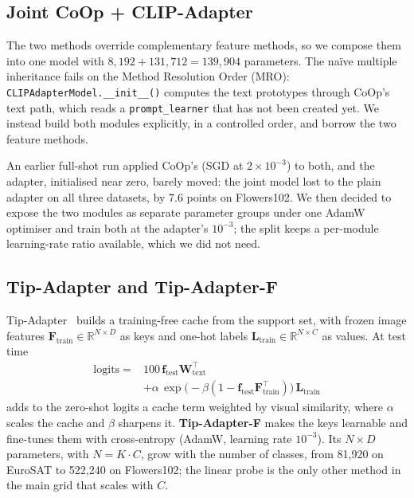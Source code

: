 \documentclass[10pt,twocolumn,letterpaper]{article}
\begin{document}
\subsection{Joint CoOp + CLIP-Adapter}\label{sec:joint}

The two methods override complementary feature methods, so we compose
them into one model with $8{,}192 + 131{,}712 = 139{,}904$ parameters.
The na\"ive multiple inheritance fails on the Method Resolution Order (MRO):
\texttt{CLIPAdapterModel.\_\_init\_\_()} computes the text prototypes
through CoOp's text path, which reads a \texttt{prompt\_learner} that has
not been created yet.  We instead build both modules explicitly, in a
controlled order, and borrow the two feature methods.

An earlier full-shot run applied CoOp's (SGD at $2\times10^{-3}$) to both, and the adapter,
initialised near zero, barely moved: the joint model lost to the plain adapter on all three datasets, by 7.6 points on Flowers102. We then decided to expose the two modules as separate parameter groups under one AdamW optimiser and train both at the adapter's $10^{-3}$; the split keeps a per-module learning-rate ratio available, which we did not need.

\subsection{Tip-Adapter and Tip-Adapter-F}\label{sec:tip}

Tip-Adapter~\cite{zhang2022tip} builds a training-free cache from the support set, with frozen image features $\mathbf{F}_{\mathrm{train}} \in \mathbb{R}^{N \times D}$ as keys and
one-hot labels $\mathbf{L}_{\mathrm{train}} \in \mathbb{R}^{N \times C}$
as values.  At test time
\begin{equation}\label{eq:tip}
\begin{split}
  \mathrm{logits} = {}& 100\,\mathbf{f}_{\mathrm{test}}
    \mathbf{W}_{\mathrm{text}}^\top \\
  &+ \alpha\,\exp\!\bigl(-\beta(1 - \mathbf{f}_{\mathrm{test}}
    \mathbf{F}_{\mathrm{train}}^\top)\bigr)\,\mathbf{L}_{\mathrm{train}}
\end{split}
\end{equation}
adds to the zero-shot logits a cache term weighted by visual similarity,
where $\alpha$ scales the cache and $\beta$ sharpens it.
\textbf{Tip-Adapter-F} makes the keys learnable and fine-tunes them with
cross-entropy (AdamW, learning rate $10^{-3}$).  Its $N \times D$
parameters, with $N = K \cdot C$, grow with the number of classes, from
81{,}920 on EuroSAT to 522{,}240 on Flowers102; the linear probe is the
only other method in the main grid that scales with $C$.
\end{document}
